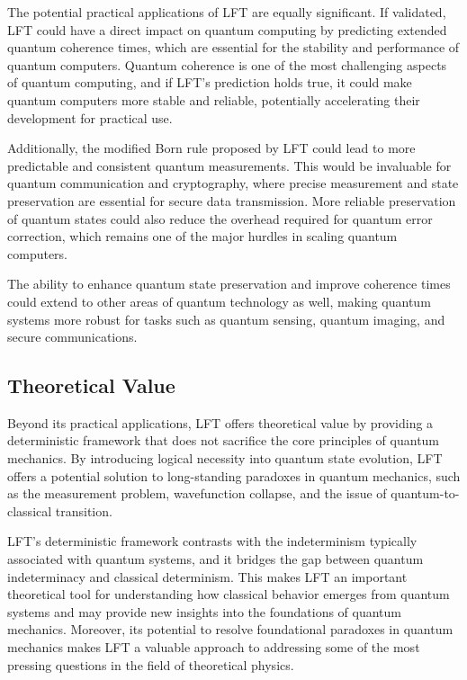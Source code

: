 The potential practical applications of LFT are equally significant. If validated, LFT could have a direct impact on quantum computing by predicting extended quantum coherence times, which are essential for the stability and performance of quantum computers. Quantum coherence is one of the most challenging aspects of quantum computing, and if LFT’s prediction holds true, it could make quantum computers more stable and reliable, potentially accelerating their development for practical use.

Additionally, the modified Born rule proposed by LFT could lead to more predictable and consistent quantum measurements. This would be invaluable for quantum communication and cryptography, where precise measurement and state preservation are essential for secure data transmission. More reliable preservation of quantum states could also reduce the overhead required for quantum error correction, which remains one of the major hurdles in scaling quantum computers.

The ability to enhance quantum state preservation and improve coherence times could extend to other areas of quantum technology as well, making quantum systems more robust for tasks such as quantum sensing, quantum imaging, and secure communications.

\subsection{Theoretical Value}

Beyond its practical applications, LFT offers theoretical value by providing a deterministic framework that does not sacrifice the core principles of quantum mechanics. By introducing logical necessity into quantum state evolution, LFT offers a potential solution to long-standing paradoxes in quantum mechanics, such as the measurement problem, wavefunction collapse, and the issue of quantum-to-classical transition.

LFT’s deterministic framework contrasts with the indeterminism typically associated with quantum systems, and it bridges the gap between quantum indeterminacy and classical determinism. This makes LFT an important theoretical tool for understanding how classical behavior emerges from quantum systems and may provide new insights into the foundations of quantum mechanics. Moreover, its potential to resolve foundational paradoxes in quantum mechanics makes LFT a valuable approach to addressing some of the most pressing questions in the field of theoretical physics.

